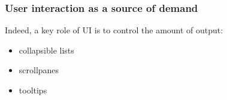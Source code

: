 \begin{frame}
\frametitle{User interaction as a source of demand}

Indeed, a key role of UI is to control the amount of output:
\begin{itemize}
\item \pause collapsible lists
\item \pause scrollpanes
\item \pause tooltips
\end{itemize}
\end{frame}
